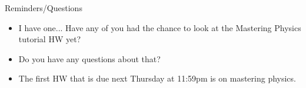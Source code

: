 \documentclass{beamer}
\begin{document}
\begin{frame}{Reminders/Questions}
\begin{center}
   \color{blue}{\Huge Question?}
\end{center}
\begin{itemize}
   \item I have one... Have any of you had the chance to look at the Mastering Physics tutorial HW yet?
   \item Do you have any questions about that?
   \item The first HW that is due next Thursday at 11:59pm is on mastering physics.
\end{itemize}
\end{frame}
\end{document}
